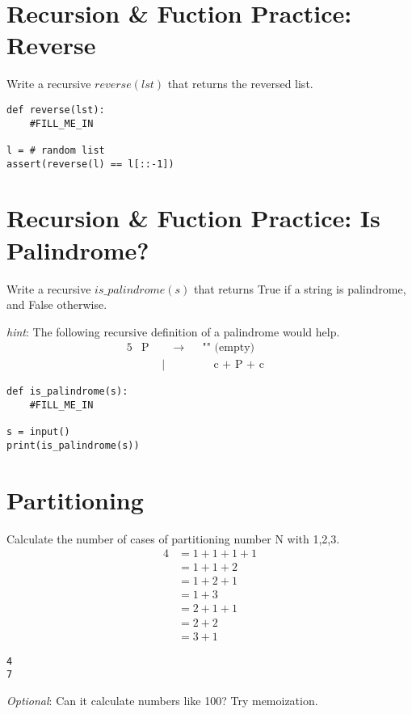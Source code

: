 \documentclass{article}
\begin{document}
\section{Recursion \& Fuction Practice: Reverse}
Write a recursive $reverse(lst)$ that returns the reversed list.
\begin{lstlisting}
def reverse(lst):
    #FILL_ME_IN

l = # random list
assert(reverse(l) == l[::-1])
\end{lstlisting}

\section{Recursion \& Fuction Practice: Is Palindrome?}
Write a recursive $is\_palindrome(s)$ that returns True if a string is
palindrome, and False otherwise.

\textit{hint}: The following recursive definition of a palindrome would help.
\begin{alignat*}{5}
  &\text{P}&\quad\rightarrow&&\text{"" (empty)}\\
  &\quad&\mid\ &&\quad\text{c + P + c}\quad&&
\end{alignat*}
\begin{lstlisting}
def is_palindrome(s):
    #FILL_ME_IN

s = input()
print(is_palindrome(s))
\end{lstlisting}

\section{Partitioning}
  Calculate the number of cases of partitioning number N with 1,2,3.\\
  \begin{align*}
  4 &= 1+1+1+1\\
    &= 1+1+2\\
    &= 1+2+1\\
    &= 1+3\\
    &= 2+1+1\\
    &= 2+2\\
    &= 3+1
  \end{align*}
\begin{lstlisting}
4
7
\end{lstlisting}
\textit{Optional}: Can it calculate numbers like 100? Try memoization.

\pagebreak
\end{document}

